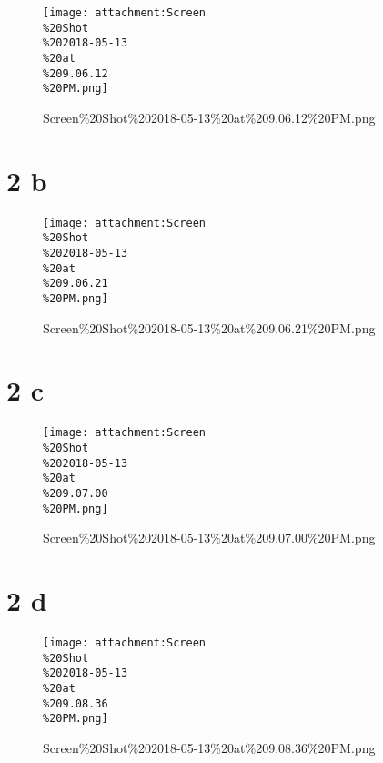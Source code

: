 \documentclass[11pt]{article}
\makeatletter
\def\maxwidth{\ifdim\Gin@nat@width>\linewidth\linewidth
    \else\Gin@nat@width\fi}
\let\Oldincludegraphics\includegraphics
\renewcommand{\includegraphics}[1]{\Oldincludegraphics[width=.8\maxwidth]{#1}}
\makeatother
\begin{document}
    \begin{figure}
\centering
\texttt{[image: attachment:Screen\\\%20Shot\\\%202018-05-13\\\%20at\\\%209.06.12\\\%20PM.png]}
\caption{Screen\%20Shot\%202018-05-13\%20at\%209.06.12\%20PM.png}
\end{figure}

    \hypertarget{b}{%
\section{2 b}\label{b}}

    \begin{figure}
\centering
\texttt{[image: attachment:Screen\\\%20Shot\\\%202018-05-13\\\%20at\\\%209.06.21\\\%20PM.png]}
\caption{Screen\%20Shot\%202018-05-13\%20at\%209.06.21\%20PM.png}
\end{figure}

    \hypertarget{c}{%
\section{2 c}\label{c}}

    \begin{figure}
\centering
\texttt{[image: attachment:Screen\\\%20Shot\\\%202018-05-13\\\%20at\\\%209.07.00\\\%20PM.png]}
\caption{Screen\%20Shot\%202018-05-13\%20at\%209.07.00\%20PM.png}
\end{figure}

    \hypertarget{d}{%
\section{2 d}\label{d}}

    \begin{figure}
\centering
\texttt{[image: attachment:Screen\\\%20Shot\\\%202018-05-13\\\%20at\\\%209.08.36\\\%20PM.png]}
\caption{Screen\%20Shot\%202018-05-13\%20at\%209.08.36\%20PM.png}
\end{figure}


    
    
    
    
\end{document}
